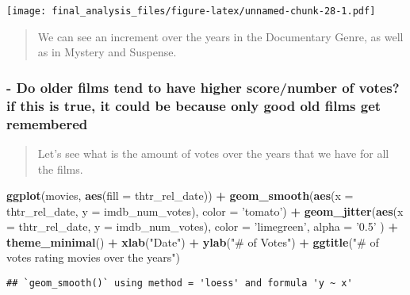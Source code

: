 \documentclass[]{article}
\newenvironment{Shaded}{\begin{snugshade}}{\end{snugshade}}
\newcommand{\KeywordTok}[1]{\textcolor[rgb]{0.13,0.29,0.53}{\textbf{#1}}}
\newcommand{\DataTypeTok}[1]{\textcolor[rgb]{0.13,0.29,0.53}{#1}}
\newcommand{\StringTok}[1]{\textcolor[rgb]{0.31,0.60,0.02}{#1}}
\newcommand{\OperatorTok}[1]{\textcolor[rgb]{0.81,0.36,0.00}{\textbf{#1}}}
\newcommand{\NormalTok}[1]{#1}
\begin{document}
\texttt{[image: final\_analysis\_files/figure-latex/unnamed-chunk-28-1.pdf]}

\begin{quote}
We can see an increment over the years in the Documentary Genre, as well
as in Mystery and Suspense.
\end{quote}

\subsubsection{- Do older films tend to have higher score/number of
votes? if this is true, it could be because only good old films get
remembered}\label{do-older-films-tend-to-have-higher-scorenumber-of-votes-if-this-is-true-it-could-be-because-only-good-old-films-get-remembered-1}

\begin{quote}
Let's see what is the amount of votes over the years that we have for
all the films.
\end{quote}

\begin{Shaded}
\begin{Highlighting}[]
\KeywordTok{ggplot}\NormalTok{(movies, }\KeywordTok{aes}\NormalTok{(}\DataTypeTok{fill =}\NormalTok{ thtr_rel_date)) }\OperatorTok{+}
\StringTok{  }\KeywordTok{geom_smooth}\NormalTok{(}\KeywordTok{aes}\NormalTok{(}\DataTypeTok{x =}\NormalTok{ thtr_rel_date, }\DataTypeTok{y =}\NormalTok{ imdb_num_votes), }\DataTypeTok{color =} \StringTok{'tomato'}\NormalTok{) }\OperatorTok{+}
\StringTok{  }\KeywordTok{geom_jitter}\NormalTok{(}\KeywordTok{aes}\NormalTok{(}\DataTypeTok{x =}\NormalTok{ thtr_rel_date, }\DataTypeTok{y =}\NormalTok{ imdb_num_votes), }\DataTypeTok{color =} \StringTok{'limegreen'}\NormalTok{, }\DataTypeTok{alpha =} \StringTok{'0.5'}\NormalTok{ ) }\OperatorTok{+}
\StringTok{  }\KeywordTok{theme_minimal}\NormalTok{() }\OperatorTok{+}
\StringTok{  }\KeywordTok{xlab}\NormalTok{(}\StringTok{"Date"}\NormalTok{) }\OperatorTok{+}
\StringTok{  }\KeywordTok{ylab}\NormalTok{(}\StringTok{"# of Votes"}\NormalTok{) }\OperatorTok{+}
\StringTok{  }\KeywordTok{ggtitle}\NormalTok{(}\StringTok{"# of votes rating movies over the years"}\NormalTok{)}
\end{Highlighting}
\end{Shaded}

\begin{verbatim}
## `geom_smooth()` using method = 'loess' and formula 'y ~ x'
\end{verbatim}
\end{document}
